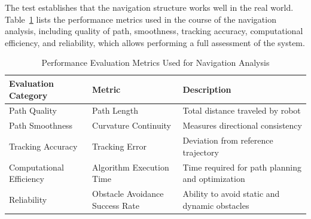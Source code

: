 The test establishes that the navigation structure works well in the real world. Table~\ref{tab:performance_metrics} lists the performance metrics used in the course of the navigation analysis, including quality of path, smoothness, tracking accuracy, computational efficiency, and reliability, which allows performing a full assessment of the system.
\begin{table}[H]
	\centering
	\caption{Performance Evaluation Metrics Used for Navigation Analysis}
	\label{tab:performance_metrics}
	\begin{tabular}{|p{3.5cm}|p{3.5cm}|p{5.5cm}|}
		\hline
		\textbf{Evaluation Category} & \textbf{Metric} & \textbf{Description} \\
		\hline
		Path Quality & Path Length & Total distance traveled by robot \\
		\hline
		Path Smoothness & Curvature Continuity & Measures directional consistency \\
		\hline
		Tracking Accuracy & Tracking Error & Deviation from reference trajectory \\
		\hline
		Computational Efficiency & Algorithm Execution Time & Time required for path planning and optimization \\
		\hline
		Reliability & Obstacle Avoidance Success Rate & Ability to avoid static and dynamic obstacles \\
		\hline
	\end{tabular}
\end{table}

